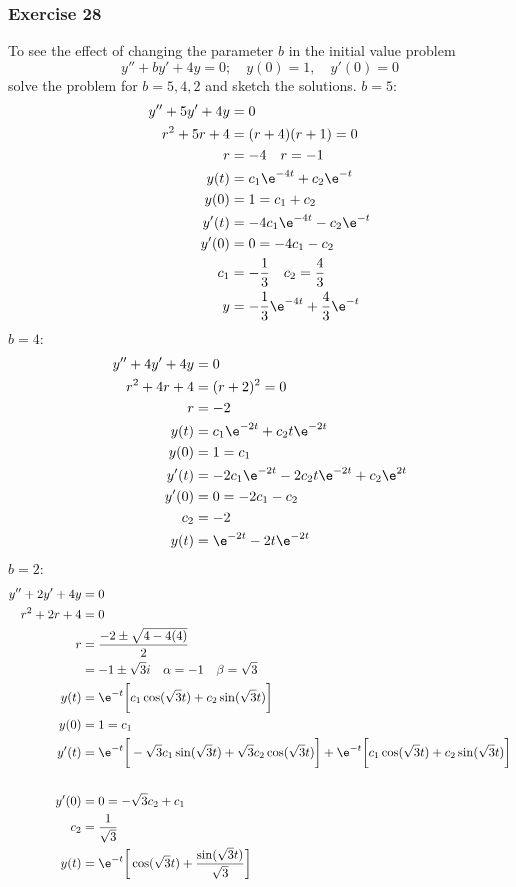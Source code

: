 \documentclass{math}
\begin{document}
\subsubsection*{Exercise 28}
To see the effect of changing the parameter \( b \) in the initial value
problem
\[ y''+by'+4y = 0; \quad y(0) = 1, \quad y'(0) = 0 \]
solve the problem for \( b = 5, 4, 2 \) and sketch the solutions.
\( b = 5 \):
\begin{align*}
  y''+5y'+4y &= 0 \\
  r^2+5r+4 &= (r+4)(r+1) = 0 \\
  r &= -4 \quad r = -1 \\
  y(t) &= c_1\e^{-4t}+c_2\e^{-t} \\
  y(0) &= 1 = c_1+c_2 \\
  y'(t) &= -4c_1\e^{-4t}-c_2\e^{-t} \\
  y'(0) &= 0 = -4c_1-c_2 \\
  c_1 &= -\frac{1}{3} \quad c_2 = \frac{4}{3} \\
  y &= -\frac{1}{3}\e^{-4t}+\frac{4}{3}\e^{-t}
\end{align*}
\( b = 4 \):
\begin{align*}
  y''+4y'+4y &= 0 \\
  r^2+4r+4 &= (r+2)^2 = 0 \\
  r &= -2 \\
  y(t) &= c_1\e^{-2t}+c_2t\e^{-2t} \\
  y(0) &= 1 = c_1 \\
  y'(t) &= -2c_1\e^{-2t}-2c_2t\e^{-2t}+c_2\e^{2t} \\
  y'(0) &= 0 = -2c_1-c_2 \\
  c_2 &= -2 \\
  y(t) &= \e^{-2t}-2t\e^{-2t}
\end{align*}
\( b = 2 \):
\begin{align*}
  y''+2y'+4y &= 0 \\
  r^2+2r+4 &= 0 \\
  r &= \frac{-2\pm\sqrt{4-4(4)}}{2} \\
  &= -1\pm\sqrt{3}i \quad \alpha = -1 \quad \beta = \sqrt{3} \\
  y(t) &= \e^{-t}\bigg[c_1\cos(\sqrt{3}t)+c_2\sin(\sqrt{3}t)\bigg] \\
  y(0) &= 1 = c_1 \\
  y'(t) &=
    \e^{-t}\bigg[-\sqrt{3}c_1\sin(\sqrt{3}t)+\sqrt{3}c_2\cos(\sqrt{3}t)\bigg]+
    \e^{-t}\bigg[c_1\cos(\sqrt{3}t)+c_2\sin(\sqrt{3}t)\bigg] \\ \\
  y'(0) &= 0 = -\sqrt{3}c_2+c_1 \\
  c_2 &= \frac{1}{\sqrt{3}} \\
  y(t) &= \e^{-t}\bigg[\cos(\sqrt{3}t)+\frac{\sin(\sqrt{3}t)}{\sqrt{3}}\bigg]
\end{align*}
\end{document}
